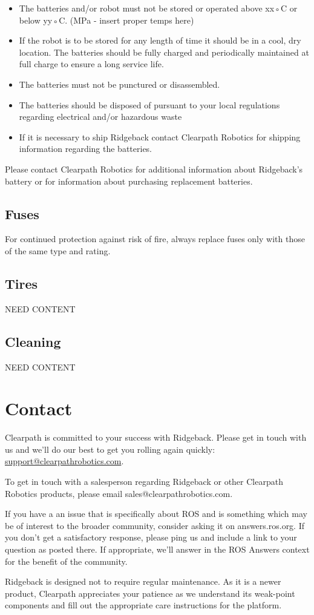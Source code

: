 \documentclass[]{clearpath-latex/clearpath-manual}
\begin{document}
\begin{itemize}[nolistsep]
	\item The batteries and/or robot must not be stored or operated above xx◦C or below yy◦C. (MPa - insert proper temps here)
	\item If the robot is to be stored for any length of time it should be in a cool, dry location. The batteries should be fully charged and periodically maintained at full charge to ensure a long service life.
	\item The batteries must not be punctured or disassembled.
	\item The batteries should be disposed of pursuant to your local regulations regarding electrical and/or hazardous waste
	\item If it is necessary to ship Ridgeback contact Clearpath Robotics for shipping information regarding the batteries.
\end{itemize}

Please contact Clearpath Robotics for additional information about Ridgeback's battery or for information about purchasing replacement batteries.


\subsection{Fuses}

For continued protection against risk of fire, always replace fuses only with those of the same type and rating.

\subsection{Tires}

NEED CONTENT

\subsection{Cleaning}

NEED CONTENT

\section{Contact}
\label{contact}

Clearpath is committed to your success with Ridgeback. Please get in touch with us and we’ll do our best to get
you rolling again quickly: \url{support@clearpathrobotics.com}.

To get in touch with a salesperson regarding Ridgeback or other Clearpath Robotics products, please email
sales@clearpathrobotics.com.

If you have a an issue that is specifically about ROS and is something which may be of interest to the broader
community, consider asking it on answers.ros.org. If you don’t get a satisfactory response, please ping us and
include a link to your question as posted there. If appropriate, we’ll answer in the ROS Answers context for
the benefit of the community.

Ridgeback is designed not to require regular maintenance. As it is a newer product, Clearpath appreciates your
patience as we understand its weak-point components and fill out the appropriate care instructions for the
platform.
\end{document}
